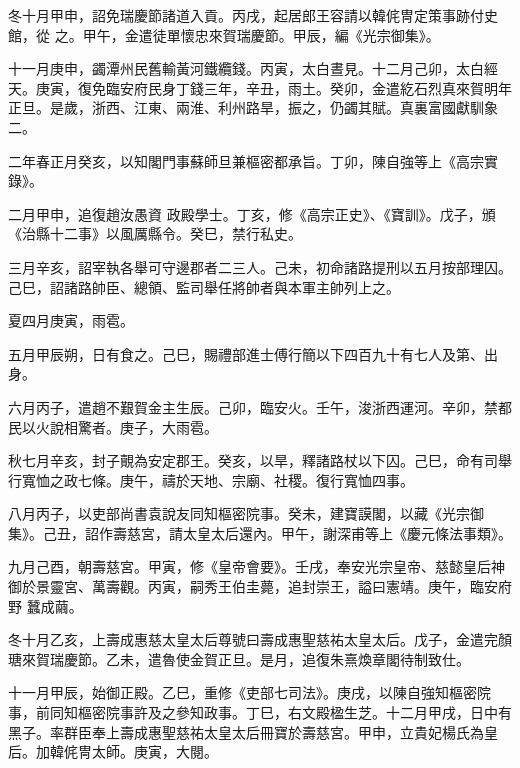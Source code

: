\begin{pinyinscope}
 冬十月甲申，詔免瑞慶節諸道入貢。丙戌，起居郎王容請以韓侂冑定策事跡付史館，從
 之。甲午，金遣徒單懷忠來賀瑞慶節。甲辰，編《光宗御集》。



 十一月庚申，蠲潭州民舊輸黃河鐵纜錢。丙寅，太白晝見。十二月己卯，太白經天。庚寅，復免臨安府民身丁錢三年，辛丑，雨土。癸卯，金遣紇石烈真來賀明年正旦。是歲，浙西、江東、兩淮、利州路旱，振之，仍蠲其賦。真裏富國獻馴象二。



 二年春正月癸亥，以知閣門事蘇師旦兼樞密都承旨。丁卯，陳自強等上《高宗實錄》。



 二月甲申，追復趙汝愚資
 政殿學士。丁亥，修《高宗正史》、《寶訓》。戊子，頒《治縣十二事》以風厲縣令。癸巳，禁行私史。



 三月辛亥，詔宰執各舉可守邊郡者二三人。己未，初命諸路提刑以五月按部理囚。己巳，詔諸路帥臣、總領、監司舉任將帥者與本軍主帥列上之。



 夏四月庚寅，雨雹。



 五月甲辰朔，日有食之。己巳，賜禮部進士傅行簡以下四百九十有七人及第、出身。



 六月丙子，遣趙不艱賀金主生辰。己卯，臨安火。壬午，浚浙西運河。辛卯，禁都民以火說相驚者。庚子，大雨雹。



 秋七月辛亥，封子覿為安定郡王。癸亥，以旱，釋諸路杖以下囚。己巳，命有司舉行寬恤之政七條。庚午，禱於天地、宗廟、社稷。復行寬恤四事。



 八月丙子，以吏部尚書袁說友同知樞密院事。癸未，建寶謨閣，以藏《光宗御集》。己丑，詔作壽慈宮，請太皇太后還內。甲午，謝深甫等上《慶元條法事類》。



 九月己酉，朝壽慈宮。甲寅，修《皇帝會要》。壬戌，奉安光宗皇帝、慈懿皇后神御於景靈宮、萬壽觀。丙寅，嗣秀王伯圭薨，追封崇王，謚曰憲靖。庚午，臨安府野
 蠶成繭。



 冬十月乙亥，上壽成惠慈太皇太后尊號曰壽成惠聖慈祐太皇太后。戊子，金遣完顏瑭來賀瑞慶節。乙未，遣魯使金賀正旦。是月，追復朱熹煥章閣待制致仕。



 十一月甲辰，始御正殿。乙巳，重修《吏部七司法》。庚戌，以陳自強知樞密院事，前同知樞密院事許及之參知政事。丁巳，右文殿楹生芝。十二月甲戌，日中有黑子。率群臣奉上壽成惠聖慈祐太皇太后冊寶於壽慈宮。甲申，立貴妃楊氏為皇后。加韓侂冑太師。庚寅，大閱。




\end{pinyinscope}
